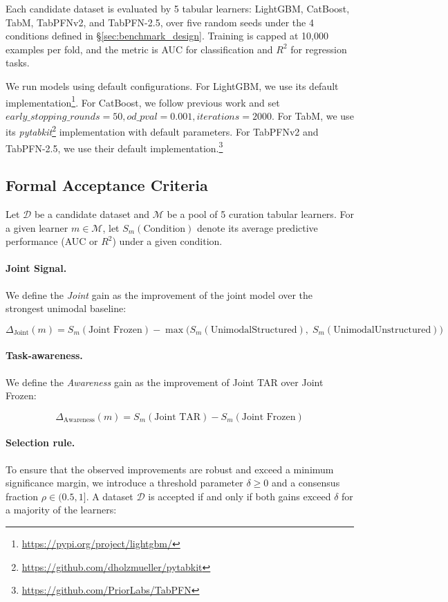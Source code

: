 \documentclass{llmxive}
\begin{document}
Each candidate dataset is evaluated by 5 tabular learners: LightGBM, CatBoost, TabM, TabPFNv2, and TabPFN-2.5, over five random seeds under the 4 conditions defined in \S\ref{sec:benchmark_design}. Training is capped at 10,000 examples per fold, and the metric is AUC for classification and $R^2$ for regression tasks.

We run models using default configurations. For LightGBM, we use its default implementation\footnote{\url{https://pypi.org/project/lightgbm/}}. For CatBoost, we follow previous work \cite{gorishniy_revisiting_2021, arazi_tabstar_2025} and set $early\_stopping\_rounds = 50, od\_pval = 0.001, iterations = 2000$. For TabM, we use its \textit{pytabkit}\footnote{\url{https://github.com/dholzmueller/pytabkit}} implementation with default parameters. For TabPFNv2 and TabPFN-2.5, we use their default implementation.\footnote{\url{https://github.com/PriorLabs/TabPFN}}


\subsection{Formal Acceptance Criteria}
\label{app:curation_formal}


Let $\mathcal{D}$ be a candidate dataset and $\mathcal{M}$ be a pool of 5 curation tabular learners. For a given learner $m \in \mathcal{M}$, let $S_m(\text{Condition})$ denote its average predictive performance (AUC or $R^2$) under a given condition.

\paragraph{Joint Signal.} We define the \textit{Joint} gain as the improvement of the joint model over the strongest unimodal baseline:

$$ \Delta_{\text{Joint}}(m) = S_m(\text{Joint Frozen}) - \max\big(S_m(\text{UnimodalStructured}),\; S_m(\text{UnimodalUnstructured})\big) $$

\paragraph{Task-awareness.} We define the \textit{Awareness} gain as the improvement of Joint TAR over Joint Frozen:

$$ \Delta_{\text{Awareness}}(m) = S_m(\text{Joint TAR}) - S_m(\text{Joint Frozen}) $$

\paragraph{Selection rule.} To ensure that the observed improvements are robust and exceed a minimum significance margin, we introduce a threshold parameter $\delta \geq 0$ and a consensus fraction $\rho \in (0.5, 1]$. A dataset $\mathcal{D}$ is accepted if and only if both gains exceed $\delta$ for a majority of the learners:
\end{document}
